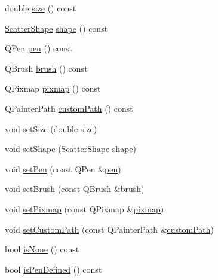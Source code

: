 \begin{DoxyCompactItemize}
\item 
double \hyperlink{classQCPScatterStyle_a1973ee650368f1c5f55507b78473f634}{size} () const 
\item 
\hyperlink{classQCPScatterStyle_adb31525af6b680e6f1b7472e43859349}{Scatter\+Shape} \hyperlink{classQCPScatterStyle_a4462a25ef17769631f4e0aa81dadca4b}{shape} () const 
\item 
Q\+Pen \hyperlink{classQCPScatterStyle_a3c24c3bf37b561b4807aed9f1418ab58}{pen} () const 
\item 
Q\+Brush \hyperlink{classQCPScatterStyle_a46bf481d84bfa31b287dd43a3bf86d37}{brush} () const 
\item 
Q\+Pixmap \hyperlink{classQCPScatterStyle_a9bab44cc41fcd585621a4b3e0e48231b}{pixmap} () const 
\item 
Q\+Painter\+Path \hyperlink{classQCPScatterStyle_a4dd4998dfb0d6889205668a06c790328}{custom\+Path} () const 
\item 
void \hyperlink{classQCPScatterStyle_aaefdd031052892c4136129db68596e0f}{set\+Size} (double \hyperlink{classQCPScatterStyle_a1973ee650368f1c5f55507b78473f634}{size})
\item 
void \hyperlink{classQCPScatterStyle_a7c641c4d4c6d29cb705d3887cfce91c1}{set\+Shape} (\hyperlink{classQCPScatterStyle_adb31525af6b680e6f1b7472e43859349}{Scatter\+Shape} \hyperlink{classQCPScatterStyle_a4462a25ef17769631f4e0aa81dadca4b}{shape})
\item 
void \hyperlink{classQCPScatterStyle_a761f1f229cc0ca4703e1e2b89f6dd1ba}{set\+Pen} (const Q\+Pen \&\hyperlink{classQCPScatterStyle_a3c24c3bf37b561b4807aed9f1418ab58}{pen})
\item 
void \hyperlink{classQCPScatterStyle_a74d692aaeb8d4b36d6f7d510e44264b1}{set\+Brush} (const Q\+Brush \&\hyperlink{classQCPScatterStyle_a46bf481d84bfa31b287dd43a3bf86d37}{brush})
\item 
void \hyperlink{classQCPScatterStyle_a5fb611d46acfac520d7b89a1c71d9246}{set\+Pixmap} (const Q\+Pixmap \&\hyperlink{classQCPScatterStyle_a9bab44cc41fcd585621a4b3e0e48231b}{pixmap})
\item 
void \hyperlink{classQCPScatterStyle_a96a3e949f90b2afe5677ca9412a12a1e}{set\+Custom\+Path} (const Q\+Painter\+Path \&\hyperlink{classQCPScatterStyle_a4dd4998dfb0d6889205668a06c790328}{custom\+Path})
\item 
bool \hyperlink{classQCPScatterStyle_aa3861281108d0adbeb291c820ea3925c}{is\+None} () const 
\item 
bool \hyperlink{classQCPScatterStyle_a7f1385a8d5e4f349a6b8030723fbd0f7}{is\+Pen\+Defined} () const 

\end{DoxyCompactItemize}
